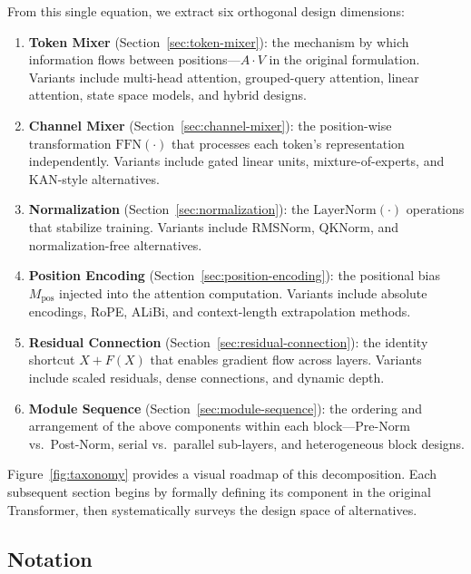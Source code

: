 \documentclass[11pt, a4paper]{article}
\begin{document}
From this single equation, we extract six orthogonal design dimensions:

\begin{enumerate}[leftmargin=2em, itemsep=4pt]
\item \textbf{Token Mixer} (Section~\ref{sec:token-mixer}): the mechanism by which information flows between positions---$A \cdot V$ in the original formulation. Variants include multi-head attention, grouped-query attention, linear attention, state space models, and hybrid designs.

\item \textbf{Channel Mixer} (Section~\ref{sec:channel-mixer}): the position-wise transformation $\mathrm{FFN}(\cdot)$ that processes each token's representation independently. Variants include gated linear units, mixture-of-experts, and KAN-style alternatives.

\item \textbf{Normalization} (Section~\ref{sec:normalization}): the $\mathrm{LayerNorm}(\cdot)$ operations that stabilize training. Variants include RMSNorm, QKNorm, and normalization-free alternatives.

\item \textbf{Position Encoding} (Section~\ref{sec:position-encoding}): the positional bias $M_{\mathrm{pos}}$ injected into the attention computation. Variants include absolute encodings, RoPE, ALiBi, and context-length extrapolation methods.

\item \textbf{Residual Connection} (Section~\ref{sec:residual-connection}): the identity shortcut $X + F(X)$ that enables gradient flow across layers. Variants include scaled residuals, dense connections, and dynamic depth.

\item \textbf{Module Sequence} (Section~\ref{sec:module-sequence}): the ordering and arrangement of the above components within each block---Pre-Norm vs.\ Post-Norm, serial vs.\ parallel sub-layers, and heterogeneous block designs.
\end{enumerate}

Figure~\ref{fig:taxonomy} provides a visual roadmap of this decomposition.
Each subsequent section begins by formally defining its component in the original Transformer, then systematically surveys the design space of alternatives.

\subsection*{Notation}
\end{document}
